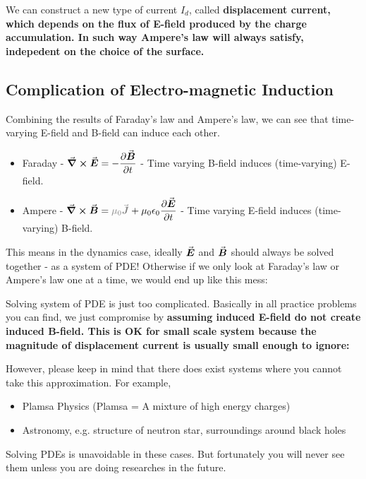 \documentclass[class=article, crop=false, 12pt]{standalone}
\begin{document}
We can construct a new type of current $I_d$,
called \bf{displacement current},
which depends on the flux of E-field produced by the charge accumulation.
In such way Ampere's law will always satisfy, indepedent on the choice of the surface.



\subsection{Complication of Electro-magnetic Induction}

Combining the results of Faraday's law and Ampere's law,
we can see that time-varying E-field and B-field can induce each other.
\begin{itemize}
    \item Faraday - $\curl \vvec{E} = -\pdvv{\vvec{B}}{t}$ - 
    Time varying B-field induces (time-varying) E-field.

    \item Ampere - $\curl \vvec{B} = \gray{\mu_0\vvec{J}} + \mu_0\epsilon_0\pdvv{\vvec{E}}{t}$ -
    Time varying E-field induces (time-varying) B-field.
\end{itemize}

This means in the dynamics case, 
ideally $\va*{E}$ and $\va*{B}$ should always be solved together - as a system of PDE! 
Otherwise if we only look at Faraday's law or Ampere's law one at a time, 
we would end up like this mess:

Solving system of PDE is just too complicated.
Basically in all practice problems you can find, 
we just compromise by \bf{assuming induced E-field do not create induced B-field}.
This is OK for small scale system because the magnitude of displacement current 
is usually small enough to ignore:

However, please keep in mind that 
there does exist systems where you cannot take this approximation.
For example,
\begin{itemize}
    \item Plamsa Physics (Plamsa = A mixture of high energy charges)
    \item Astronomy, e.g. structure of neutron star, surroundings around black holes
\end{itemize}

Solving PDEs is unavoidable in these cases. 
But fortunately you will never see them unless you are doing researches in the future. 




\theend
\end{document}
